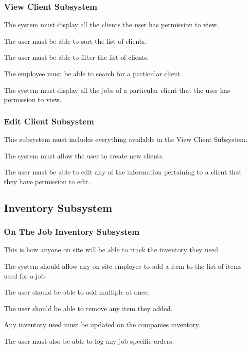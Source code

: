 \documentclass{article}
\begin{document}
	\subsubsection*{View Client Subsystem}	
	\begin{list}{R.}{}
		\item The system must display all the clients the user has permission to view.
		\begin{list}{R.}{}
			\item The user must be able to sort the list of clients.
			\item The user must be able to filter the list of clients.
			\item The employee must be able to search for a particular client.
		\end{list}
		\item The system must display all the jobs of a particular client that the user has permission to view.
	\end{list}
	\subsubsection*{Edit Client Subsystem}	
	\begin{list}{R.}{}
		\item This subsystem must includes everything available in the View Client Subsystem.
		\item The system must allow the user to create new clients.
		\item The user must be able to edit any of the information pertaining to a client that they have permission to edit.
	\end{list}
	
	
	\subsection*{Inventory Subsystem}
	\subsubsection*{On The Job Inventory Subsystem}	
	This is how anyone on site will be able to track the inventory they used.
	\begin{list}{R.}{}
		\item The system should allow any on site employee to add a item to the list of items used for a job. 
		\item The user should be able to add multiple at once.
		\item The user should be able to remove any item they added.
		\item Any inventory used must be updated on the companies inventory.
		\item The user must also be able to log any job specific orders.
	\end{list}
\end{document}
